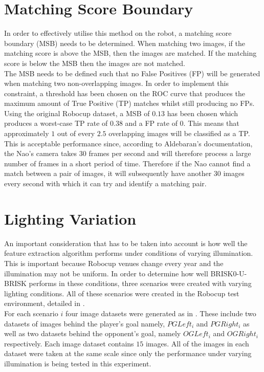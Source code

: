 \documentclass{report}
\begin{document}
\section{Matching Score Boundary}
\label{sec:matchingScoreBoundary}
In order to effectively utilise this method on the robot, a matching score boundary (MSB) needs to be determined. When matching two images, if the matching score is above the MSB, then the images are matched. If the matching score is below the MSB then the images are not matched. \\

The MSB needs to be defined such that no False Positives (FP) will be generated when matching two non-overlapping images. In order to implement this constraint, a threshold has been chosen on the ROC curve that produces the maximum amount of True Positive (TP) matches whilst still producing no FPs. Using the original Robocup dataset, a MSB of $0.13$ has been chosen which produces a worst-case TP rate of $0.38$ and a FP rate of $0$. This means that approximately $1$ out of every $2.5$ overlapping images will be classified as a TP. This is acceptable performance since, according to Aldebaran's documentation, the Nao's camera takes $30$ frames per second and will therefore process a large number of frames in a short period of time. Therefore if the Nao cannot find a match between a pair of images, it will subsequently have another $30$ images every second with which it can try and identify a matching pair.\\

\section{Lighting Variation}
\label{sec:lighting}
An important consideration that has to be taken into account is how well the feature extraction algorithm performs under conditions of varying illumination. This is important because Robocup venues change every year and the illumination may not be uniform. In order to determine how well BRISK0-U-BRISK performs in these conditions, three scenarios were created with varying lighting conditions. All of these scenarios were created in the Robocup test environment, detailed in .\\ 

For each scenario $i$ four image datasets were generated as in . These include  two datasets of images behind the player's goal namely, \textit{$PG Left_{i}$} and \textit{$PG Right_i$} as well as two datasets behind the opponent's goal, namely \textit{$OG Left_i$} and \textit{$OG Right_i$} respectively. Each image dataset contains $15$ images. All of the images in each dataset were taken at the same scale since only the performance under varying illumination is being tested in this experiment.\\ 
\end{document}
